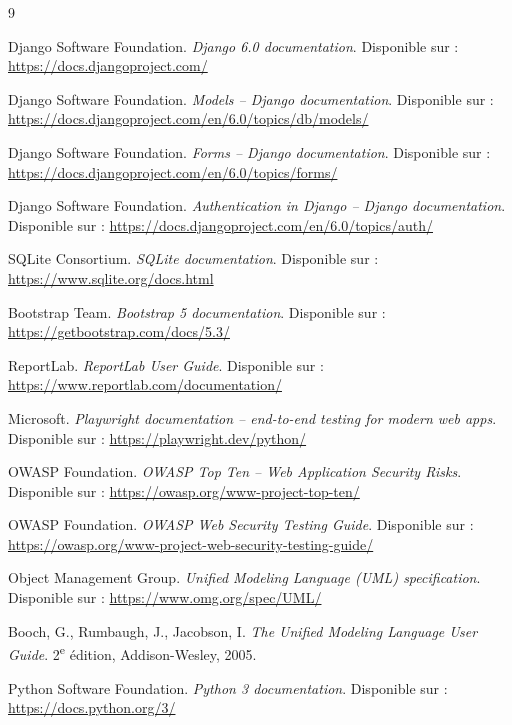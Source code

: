 \documentclass[12pt,a4paper]{report}
\begin{document}
\begin{thebibliography}{9}

Django Software Foundation. \textit{Django 6.0 documentation}. Disponible sur : \url{https://docs.djangoproject.com/}

Django Software Foundation. \textit{Models -- Django documentation}. Disponible sur : \url{https://docs.djangoproject.com/en/6.0/topics/db/models/}

Django Software Foundation. \textit{Forms -- Django documentation}. Disponible sur : \url{https://docs.djangoproject.com/en/6.0/topics/forms/}

Django Software Foundation. \textit{Authentication in Django -- Django documentation}. Disponible sur : \url{https://docs.djangoproject.com/en/6.0/topics/auth/}

SQLite Consortium. \textit{SQLite documentation}. Disponible sur : \url{https://www.sqlite.org/docs.html}

Bootstrap Team. \textit{Bootstrap 5 documentation}. Disponible sur : \url{https://getbootstrap.com/docs/5.3/}

ReportLab. \textit{ReportLab User Guide}. Disponible sur : \url{https://www.reportlab.com/documentation/}

Microsoft. \textit{Playwright documentation -- end-to-end testing for modern web apps}. Disponible sur : \url{https://playwright.dev/python/}

OWASP Foundation. \textit{OWASP Top Ten -- Web Application Security Risks}. Disponible sur : \url{https://owasp.org/www-project-top-ten/}

OWASP Foundation. \textit{OWASP Web Security Testing Guide}. Disponible sur : \url{https://owasp.org/www-project-web-security-testing-guide/}

Object Management Group. \textit{Unified Modeling Language (UML) specification}. Disponible sur : \url{https://www.omg.org/spec/UML/}

Booch, G., Rumbaugh, J., Jacobson, I. \textit{The Unified Modeling Language User Guide}. 2\textsuperscript{e} édition, Addison-Wesley, 2005.

Python Software Foundation. \textit{Python 3 documentation}. Disponible sur : \url{https://docs.python.org/3/}

\end{thebibliography}

\appendix

\end{document}
